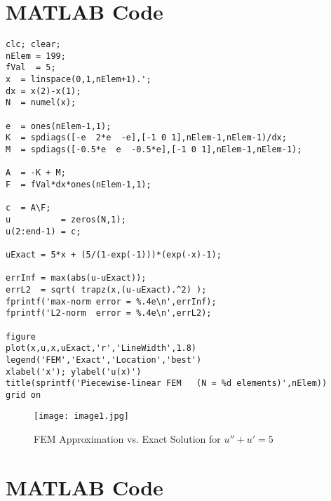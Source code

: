 \documentclass{article}
\begin{document}
\section*{MATLAB Code}


\begin{tcolorbox}[title=Piecewise‐linear FEM MATLAB Code]
\begin{lstlisting}
clc; clear;
nElem = 199;                 
fVal  = 5;                   
x  = linspace(0,1,nElem+1).';
dx = x(2)-x(1);
N  = numel(x);

e  = ones(nElem-1,1);
K  = spdiags([-e  2*e  -e],[-1 0 1],nElem-1,nElem-1)/dx;
M  = spdiags([-0.5*e  e  -0.5*e],[-1 0 1],nElem-1,nElem-1);

A  = -K + M;                       
F  = fVal*dx*ones(nElem-1,1);      

c  = A\F;                          
u          = zeros(N,1);           
u(2:end-1) = c;

uExact = 5*x + (5/(1-exp(-1)))*(exp(-x)-1);

errInf = max(abs(u-uExact));
errL2  = sqrt( trapz(x,(u-uExact).^2) );
fprintf('max-norm error = %.4e\n',errInf);
fprintf('L2-norm  error = %.4e\n',errL2);

figure
plot(x,u,x,uExact,'r','LineWidth',1.8)
legend('FEM','Exact','Location','best')
xlabel('x'); ylabel('u(x)')
title(sprintf('Piecewise-linear FEM   (N = %d elements)',nElem))
grid on
\end{lstlisting}
\end{tcolorbox}

\begin{figure}[h!]
    \centering
    \texttt{[image: image1.jpg]}
    \caption{FEM Approximation vs. Exact Solution for $u'' + u' = 5$}
    \label{fig:fem_solution}
\end{figure}

\newpage

\section*{MATLAB Code}

\end{document}
